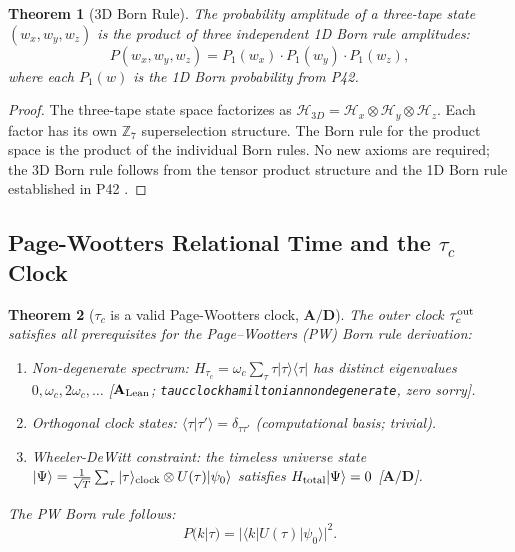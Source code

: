 \documentclass[11pt]{article}
\newtheorem{theorem}{Theorem}[section]
\theoremstyle{remark}
\newcommand{\ZS}{\mathbb{Z}_7}
\newcommand{\lean}[1]{%
  \penalty-100
  \begingroup\def\_{\textunderscore\allowbreak}\texttt{#1}\endgroup}
\newcommand{\CatAL}{\ensuremath{\textbf{A}_{\rm Lean}}}
\newcommand{\CatAD}{\textbf{A/D}}
\newcommand{\taucout}{\tau_c^{\rm out}}
\begin{document}
\begin{theorem}[3D Born Rule]
\label{thm:born}
The probability amplitude of a three-tape state $(w_x, w_y, w_z)$ is the
product of three independent 1D Born rule amplitudes:
\begin{equation}
  P(w_x, w_y, w_z) = P_1(w_x) \cdot P_1(w_y) \cdot P_1(w_z),
\end{equation}
where each $P_1(w)$ is the 1D Born probability from P42.
\end{theorem}
\begin{proof}
The three-tape state space factorizes as
$\mathcal{H}_{3D} = \mathcal{H}_x \otimes \mathcal{H}_y \otimes
\mathcal{H}_z$. Each factor has its own $\ZS$ superselection structure.
The Born rule for the product space is the product of the individual
Born rules. No new axioms are required; the 3D Born rule follows from the
tensor product structure and the 1D Born rule established in P42
\cite{SpivackPhiMDLField}.
\end{proof}

\subsection{Page-Wootters Relational Time and the $\tau_c$ Clock}

\begin{theorem}[$\tau_c$ is a valid Page-Wootters clock, $\CatAD$]
\label{thm:pw-clock}
The outer clock $\taucout$ satisfies all prerequisites for the
Page--Wootters (PW) Born rule derivation:
\begin{enumerate}[noitemsep,label=(\alph*)]
\item \emph{Non-degenerate spectrum:} $H_{\tau_c} = \omega_c\sum_\tau\tau|\tau\rangle\langle\tau|$
      has distinct eigenvalues $0, \omega_c, 2\omega_c, \ldots$
      [$\CatAL$; \lean{tau\_c\_clock\_hamiltonian\_nondegenerate}, zero sorry].
\item \emph{Orthogonal clock states:} $\langle\tau|\tau'\rangle = \delta_{\tau\tau'}$
      (computational basis; trivial).
\item \emph{Wheeler-DeWitt constraint:} the timeless universe state
      $|\Psi\rangle = \frac{1}{\sqrt{T}}\sum_\tau|\tau\rangle_{\rm clock}\otimes U(\tau)|\psi_0\rangle$
      satisfies $H_{\rm total}|\Psi\rangle = 0$ [$\CatAD$].
\end{enumerate}
The PW Born rule follows:
\begin{equation}
  P(k|\tau) = |\langle k | U(\tau) | \psi_0\rangle|^2.
\end{equation}
\end{theorem}
\end{document}
